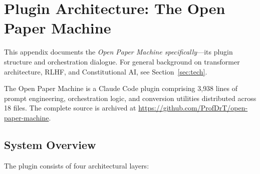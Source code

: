
\appendix

\section{Plugin Architecture: The Open Paper Machine}
\label{app:plugin}

This appendix documents the \textit{Open Paper Machine specifically}---its plugin structure and orchestration dialogue. For general background on transformer architecture, RLHF, and Constitutional AI, see Section~\ref{sec:tech}.

The Open Paper Machine is a Claude Code plugin comprising 3{,}938 lines of prompt engineering, orchestration logic, and conversion utilities distributed across 18 files. The complete source is archived at \url{https://github.com/ProfDrT/open-paper-machine}.

\subsection{System Overview}

The plugin consists of four architectural layers:


